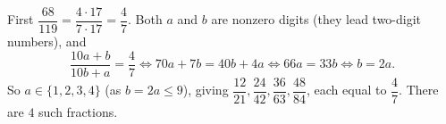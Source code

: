First $\dfrac{68}{119}=\dfrac{4\cdot17}{7\cdot17}=\dfrac{4}{7}$. Both $a$ and $b$ are nonzero digits (they lead two-digit numbers), and
\[
\dfrac{10a+b}{10b+a}=\dfrac{4}{7}\iff 70a+7b=40b+4a\iff 66a=33b\iff b=2a .
\]
So $a\in\{1,2,3,4\}$ (as $b=2a\le9$), giving $\dfrac{12}{21},\dfrac{24}{42},\dfrac{36}{63},\dfrac{48}{84}$, each equal to $\dfrac{4}{7}$. There are $\boxed{4}$ such fractions.
